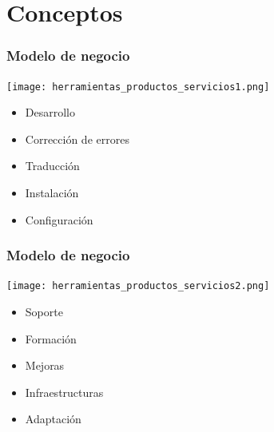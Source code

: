 \documentclass{beamer}
\begin{document}
	\section{Conceptos}
		\begin{frame}
			\frametitle{Modelo de negocio}
			\texttt{[image: herramientas\_productos\_servicios1.png]}
			\pause
			\begin{itemize}
				\item Desarrollo
				\item Corrección de errores
				\item Traducción
				\item Instalación
				\item Configuración
			\end{itemize}
		\end{frame}
		\begin{frame}
			\frametitle{Modelo de negocio}
			\texttt{[image: herramientas\_productos\_servicios2.png]}
			\pause
			\begin{itemize}
				\item Soporte
				\item Formación
				\item Mejoras
				\item Infraestructuras
				\item Adaptación
			\end{itemize}
		\end{frame}
\end{document}
